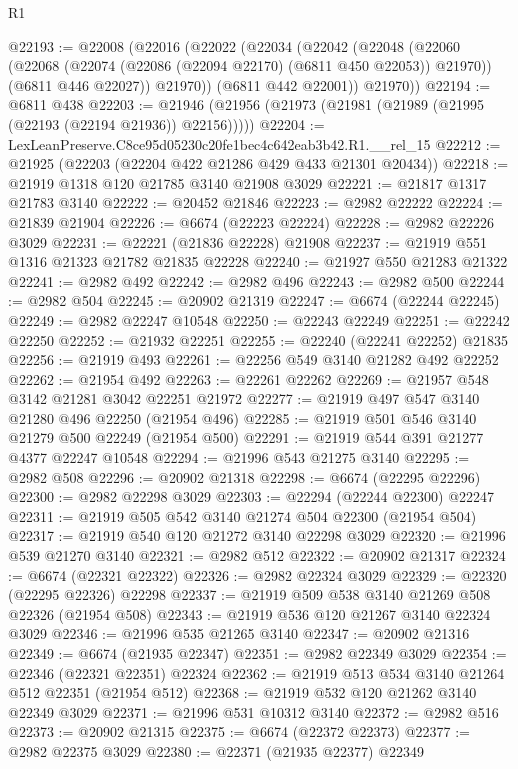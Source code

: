 \begin{lexlean}{R1}
\begin{coremodule}
@22193 := @22008
    (@22016
      (@22022
        (@22034
          (@22042
            (@22048
              (@22060
                (@22068 (@22074 (@22086 (@22094 @22170) (@6811 @450 @22053)) @21970))
                (@6811 @446 @22027))
              @21970))
          (@6811 @442 @22001))
        @21970))
@22194 := @6811 @438
@22203 := @21946 (@21956 (@21973 (@21981 (@21989 (@21995 (@22193 (@22194 @21936)) @22156)))))
@22204 := LexLeanPreserve.C8ce95d05230c20fe1bec4c642eab3b42.R1.__rel_15
@22212 := @21925 (@22203 (@22204 @422 @21286 @429 @433 @21301 @20434))
@22218 := @21919 @1318 @120 @21785 @3140 @21908 @3029
@22221 := @21817 @1317 @21783 @3140
@22222 := @20452 @21846
@22223 := @2982 @22222
@22224 := @21839 @21904
@22226 := @6674 (@22223 @22224)
@22228 := @2982 @22226 @3029
@22231 := @22221 (@21836 @22228) @21908
@22237 := @21919 @551 @1316 @21323 @21782 @21835 @22228
@22240 := @21927 @550 @21283 @21322
@22241 := @2982 @492
@22242 := @2982 @496
@22243 := @2982 @500
@22244 := @2982 @504
@22245 := @20902 @21319
@22247 := @6674 (@22244 @22245)
@22249 := @2982 @22247 @10548
@22250 := @22243 @22249
@22251 := @22242 @22250
@22252 := @21932 @22251
@22255 := @22240 (@22241 @22252) @21835
@22256 := @21919 @493
@22261 := @22256 @549 @3140 @21282 @492 @22252
@22262 := @21954 @492
@22263 := @22261 @22262
@22269 := @21957 @548 @3142 @21281 @3042 @22251 @21972
@22277 := @21919 @497 @547 @3140 @21280 @496 @22250 (@21954 @496)
@22285 := @21919 @501 @546 @3140 @21279 @500 @22249 (@21954 @500)
@22291 := @21919 @544 @391 @21277 @4377 @22247 @10548
@22294 := @21996 @543 @21275 @3140
@22295 := @2982 @508
@22296 := @20902 @21318
@22298 := @6674 (@22295 @22296)
@22300 := @2982 @22298 @3029
@22303 := @22294 (@22244 @22300) @22247
@22311 := @21919 @505 @542 @3140 @21274 @504 @22300 (@21954 @504)
@22317 := @21919 @540 @120 @21272 @3140 @22298 @3029
@22320 := @21996 @539 @21270 @3140
@22321 := @2982 @512
@22322 := @20902 @21317
@22324 := @6674 (@22321 @22322)
@22326 := @2982 @22324 @3029
@22329 := @22320 (@22295 @22326) @22298
@22337 := @21919 @509 @538 @3140 @21269 @508 @22326 (@21954 @508)
@22343 := @21919 @536 @120 @21267 @3140 @22324 @3029
@22346 := @21996 @535 @21265 @3140
@22347 := @20902 @21316
@22349 := @6674 (@21935 @22347)
@22351 := @2982 @22349 @3029
@22354 := @22346 (@22321 @22351) @22324
@22362 := @21919 @513 @534 @3140 @21264 @512 @22351 (@21954 @512)
@22368 := @21919 @532 @120 @21262 @3140 @22349 @3029
@22371 := @21996 @531 @10312 @3140
@22372 := @2982 @516
@22373 := @20902 @21315
@22375 := @6674 (@22372 @22373)
@22377 := @2982 @22375 @3029
@22380 := @22371 (@21935 @22377) @22349

\end{coremodule}
\end{lexlean}
